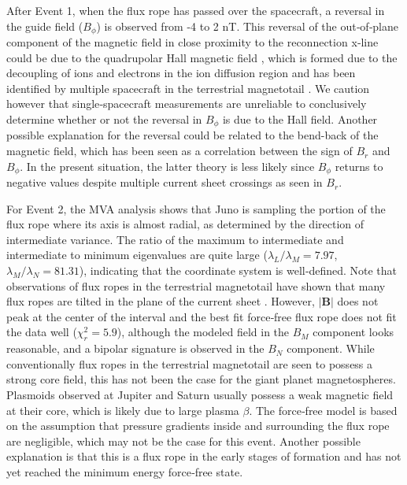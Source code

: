 After Event 1, when the flux rope has passed over the spacecraft, a reversal in the guide field ($B_\phi$) is observed from -4 to 2 nT. This reversal of the out‐of‐plane component of the magnetic field in close proximity to the reconnection x‐line could be due to the quadrupolar Hall magnetic field \cite{Eastwood2007Multi-pointOn,Sonnerup1967MagnetopauseObservations}, which is formed due to the decoupling of ions and electrons in the ion diffusion region and has been identified by multiple spacecraft in the terrestrial magnetotail \cite{Nagai2001GeotailMagnetotail}. We caution however that single‐spacecraft measurements are unreliable to conclusively determine whether or not the reversal in $B_\phi$ is due to the Hall field. Another possible explanation for the reversal could be related to the bend-back of the magnetic field, which has been seen as a correlation between the sign of $B_r$ and $B_\phi$. In the present situation, the latter theory is less likely since $B_\phi$ returns to negative values despite multiple current sheet crossings as seen in $B_r$.

For Event 2, the MVA analysis shows that Juno is sampling the portion of the flux rope where its axis is almost radial, as determined by the direction of intermediate variance. The ratio of the maximum to intermediate and intermediate to minimum eigenvalues are quite large ($\lambda_L/\lambda_M =7.97$, $\lambda_M/\lambda_N=81.31$), indicating that the coordinate system is well‐defined. Note that observations of flux ropes in the terrestrial magnetotail have shown that many flux ropes are tilted in the plane of the current sheet \cite{Slavin2003GeotailSheet}. However, $|\mathbf{B}|$ does not peak at the center of the interval and the best fit force‐free flux rope does not fit the data well ($\chi_r^2 = 5.9$), although the modeled field in the $B_M$ component looks reasonable, and a bipolar signature is observed in the $B_N$ component. While conventionally flux ropes in the terrestrial magnetotail are seen to possess a strong core field, this has not been the case for the giant planet magnetospheres. Plasmoids observed at Jupiter and Saturn usually possess a weak magnetic field at their core, which is likely due to large plasma $\beta$. The force‐free model is based on the assumption that pressure gradients inside and surrounding the flux rope are negligible, which may not be the case for this event. Another possible explanation is that this is a flux rope in the early stages of formation and has not yet reached the minimum energy force‐free state.

